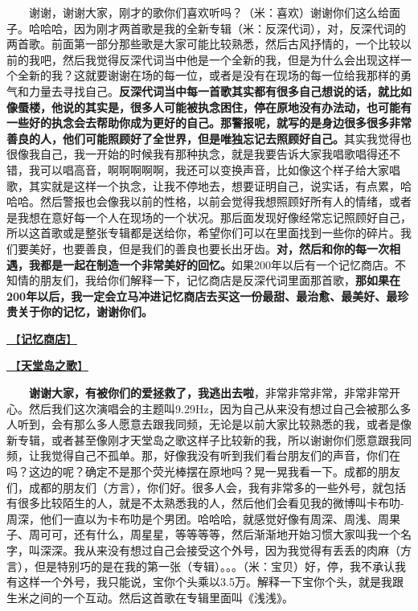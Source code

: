 \documentclass[]{ctexbook}
\begin{document}
  谢谢，谢谢大家，刚才的歌你们喜欢听吗？（米：喜欢）谢谢你们这么给面子。哈哈哈，因为刚才两首歌是我的全新专辑（米：反深代词），对，反深代词的两首歌。前面第一部分那些歌是大家可能比较熟悉，然后古风抒情的，一个比较以前的我吧，然后我觉得反深代词当中他是一个全新的我，但是为什么会出现这样一个全新的我？这就要谢谢在场的每一位，或者是没有在现场的每一位给我那样的勇气和力量去寻找自己。\textbf{反深代词当中每一首歌其实都有很多自己想说的话，就比如像蜃楼，他说的其实是，很多人可能被执念困住，停在原地没有办法动，也可能有一些好的执念会去帮助你成为更好的自己。那警报呢，就写的是身边很多很多非常善良的人，他们可能照顾好了全世界，但是唯独忘记去照顾好自己。}其实我觉得也很像我自己，我一开始的时候我有那种执念，就是我要告诉大家我唱歌唱得还不错，我可以唱高音，啊啊啊啊啊，我还可以变换声音，比如像这个样子给大家唱歌，其实就是这样一个执念，让我不停地去，想要证明自己，说实话，有点累，哈哈哈。然后警报也会像我以前的性格，以前会觉得我想照顾好所有人的情绪，或者是我想在意好每一个人在现场的一个状况。那后面发现好像经常忘记照顾好自己，所以这首歌或是整张专辑都是送给你，希望你们可以在里面找到一些你的碎片。我们要美好，也要善良，但是我们的善良也要长出牙齿。\textbf{对，然后和你的每一次相遇，我都是一起在制造一个非常美好的回忆。}如果200年以后有一个记忆商店。不知情的朋友们，我给你们解释一下，记忆商店是反深代词里面那首歌，\textbf{那如果在200年以后，我一定会立马冲进记忆商店去买这一份最甜、最治愈、最美好、最珍贵关于你的记忆，谢谢你们。}

\hyperref[the-memory-store]{🎵【\textbf{记忆商店}】}

\hyperref[haven-song]{🎵【\textbf{天堂岛之歌}】}

  \textbf{谢谢大家，有被你们的爱拯救了，我逃出去啦}，非常非常非常，非常非常开心。然后我们这次演唱会的主题叫9.29Hz，因为自己从来没有想过自己会被那么多人听到，会有那么多人愿意去跟我同频，无论是以前大家比较熟悉的我，或者是像新专辑，或者甚至像刚才天堂岛之歌这样子比较新的我，所以谢谢你们愿意跟我同频，让我觉得自己不孤单。那，好像我没有听到我们看台朋友们的声音，你们在吗？这边的呢？确定不是那个荧光棒摆在原地吗？晃一晃我看一下。成都的朋友们，成都的朋友们（方言），你们好。很多人会，我有非常多的一些外号，就包括有很多比较陌生的人，就是不太熟悉我的人，然后他们会看见我的微博叫卡布叻-周深，他们一直以为卡布叻是个男团。哈哈哈，就感觉好像有周深、周浅、周果子、周可可，还有什么，周星星，等等等等，然后渐渐地开始习惯大家叫我一个名字，叫深深。我从来没有想过自己会接受这个外号，因为我觉得有丢丢的肉麻（方言），但是特别巧的是在我的第一张（专辑）。。。（米：宝贝）好，停，我不承认我有这样一个外号，我只能说，宝你个头乘以3.5万。解释一下宝你个头，就是我跟生米之间的一个互动。然后这首歌在专辑里面叫《浅浅》。
\end{document}
